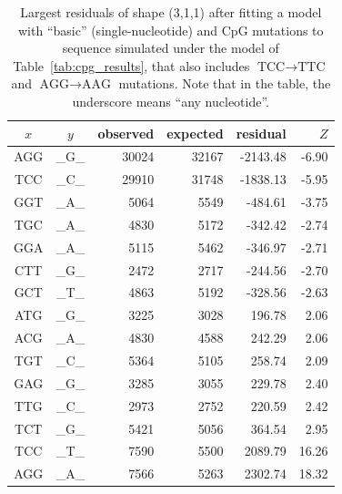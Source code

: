 \documentclass{article}
\newcommand{\nA}{\mbox{A}}  %
\newcommand{\nC}{\mbox{C}}
\newcommand{\nG}{\mbox{G}}
\newcommand{\nT}{\mbox{T}}
\theoremstyle{plain}
\theoremstyle{definition}
\begin{document}
\begin{table}
    \begin{center}
        \begin{tabular}{ccrrrr}
            \hline
                $x$ & $y$ & observed &   expected &    residual &  $Z$ \\
                \hline
                \nA\nG\nG  &  \_\nG\_  &  30024  &  32167  &  -2143.48  &  -6.90 \\
                \nT\nC\nC  &  \_\nC\_  &  29910  &  31748  &  -1838.13  &  -5.95 \\
                \nG\nG\nT  &  \_\nA\_  &   5064  &   5549  &   -484.61  &  -3.75 \\
                \nT\nG\nC  &  \_\nA\_  &   4830  &   5172  &   -342.42  &  -2.74 \\
                \nG\nG\nA  &  \_\nA\_  &   5115  &   5462  &   -346.97  &  -2.71 \\
                \nC\nT\nT  &  \_\nG\_  &   2472  &   2717  &   -244.56  &  -2.70 \\
                \nG\nC\nT  &  \_\nT\_  &   4863  &   5192  &   -328.56  &  -2.63 \\
                \hline
                \nA\nT\nG  &  \_\nG\_  &   3225  &   3028  &    196.78  &   2.06  \\
                \nA\nC\nG  &  \_\nA\_  &   4830  &   4588  &    242.29  &   2.06  \\
                \nT\nG\nT  &  \_\nC\_  &   5364  &   5105  &    258.74  &   2.09  \\
                \nG\nA\nG  &  \_\nG\_  &   3285  &   3055  &    229.78  &   2.40  \\
                \nT\nT\nG  &  \_\nC\_  &   2973  &   2752  &    220.59  &   2.42  \\
                \nT\nC\nT  &  \_\nG\_  &   5421  &   5056  &    364.54  &   2.95  \\
                \nT\nC\nC  &  \_\nT\_  &   7590  &   5500  &   2089.79  &  16.26  \\
                \nA\nG\nG  &  \_\nA\_  &   7566  &   5263  &   2302.74  &  18.32  \\
                \hline
        \end{tabular}
    \end{center}
    \caption{
        Largest residuals of shape (3,1,1) after fitting a model with ``basic''
        (single-nucleotide) and CpG mutations to sequence simulated under the model
        of Table~\ref{tab:cpg_results}, that also includes $\nT\nC\nC \to \nT\nT\nC$ and $\nA\nG\nG \to \nA\nA\nG$ mutations.
        Note that in the table, the underscore means ``any nucleotide''.
        \label{tab:resid2}
    }
\end{table}
\end{document}
